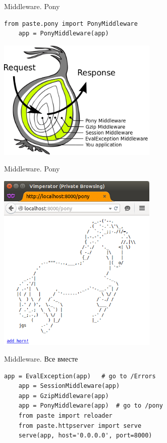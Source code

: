 \begin{frame}[fragile]{Middleware. Pony}
    \begin{lstlisting}[style=python]
    from paste.pony import PonyMiddleware
    app = PonyMiddleware(app)
    \end{lstlisting}
    \begin{center}
        \includegraphics[width=3in]{media/wsgi_as_onion_pony.png}
    \end{center}
\end{frame}

\begin{frame}{Middleware. Pony}
    \begin{center}
        \includegraphics[width=3in]{media/wsgi_example_pony.png}
    \end{center}
\end{frame}

\begin{frame}[fragile]{Middleware. Все вместе}
    \begin{lstlisting}[style=python]
    app = EvalException(app)   # go to /Errors
    app = SessionMiddleware(app)
    app = GzipMiddleware(app)
    app = PonyMiddleware(app)  # go to /pony
    from paste import reloader
    from paste.httpserver import serve
    serve(app, host='0.0.0.0', port=8000)
    \end{lstlisting}
\end{frame}

